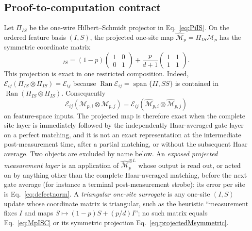 \documentclass[aps,prx,reprint,superscriptaddress,nobibnotes,longbibliography]{revtex4-2}
\theoremstyle{remark}
\begin{document}
\subsection{Proof-to-computation contract}

Let $\Pi_{IS}$ be the one-wire Hilbert--Schmidt projector in Eq.~\eqref{eq:PiIS}.  On the ordered feature basis $(I,S)$, the projected one-site map $\widehat{\mathcal M}_p=\Pi_{IS}\mathcal M_p$ has the symmetric coordinate matrix
\begin{equation}
 [\widehat{\mathcal M}_p]_{IS}=(1-p)\begin{pmatrix}1&0\\0&1\end{pmatrix}
 +\frac{p}{d+1}\begin{pmatrix}1&1\\1&1\end{pmatrix}.
 \label{eq:projectedMsymmetric}
\end{equation}
This projection is exact in one restricted composition.  Indeed,
$\mathcal E_{ij}(\Pi_{IS}\otimes\Pi_{IS})=\mathcal E_{ij}$ because
$\operatorname{Ran}\mathcal E_{ij}=\operatorname{span}\{II,SS\}$ is contained in
$\operatorname{Ran}(\Pi_{IS}\otimes\Pi_{IS})$.  Consequently
\begin{equation}
 \mathcal E_{ij}(\mathcal M_{p,i}\otimes\mathcal M_{p,j})
 =\mathcal E_{ij}(\widehat{\mathcal M}_{p,i}\otimes
 \widehat{\mathcal M}_{p,j})
 \label{eq:projected-equivalence}
\end{equation}
on feature-space inputs.  The projected map is therefore exact when the complete site layer is immediately followed by the independently Haar-averaged gate layer on a perfect matching, and it is not an exact representation at the intermediate post-measurement time, after a partial matching, or without the subsequent Haar average.  Two objects are excluded by name below.  An \emph{exposed projected measurement layer} is an application of $\widehat{\mathcal M}_p^{\otimes L}$ whose output is read out, or acted on by anything other than the complete Haar-averaged matching, before the next gate average (for instance a terminal post-measurement strobe); its error per site is Eq.~\eqref{eq:defectnorm}.  A \emph{triangular one-site surrogate} is any one-site $(I,S)$ update whose coordinate matrix is triangular, such as the heuristic ``measurement fixes $I$ and maps $S\mapsto(1-p)S+(p/d)I$''; no such matrix equals Eq.~\eqref{eq:MpISC} or its symmetric projection Eq.~\eqref{eq:projectedMsymmetric}.
\end{document}
